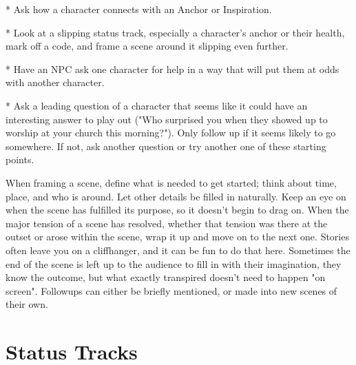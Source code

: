 \documentclass[
  oneside,
  statementpaper,
  9pt]{memoir}
\begin{document}
\begin{MC}
* Ask how a character connects with an Anchor or Inspiration.

* Look at a slipping status track, especially a character’s anchor or their health, mark off a code, and frame a scene around it slipping even further.

* Have an NPC ask one character for help in a way that will put them at odds with another character.

* Ask a leading question of a character that seems like it could have an interesting answer to play out ("Who surprised you when they showed up to worship at your church this morning?"). Only follow up if it seems likely to go somewhere. If not, ask another question or try another one of these starting points.

When framing a scene, define what is needed to get started; think about time, place, and who is around. Let other details be filled in naturally. Keep an eye on when the scene has fulfilled its purpose, so it doesn’t begin to drag on. When the major tension of a scene has resolved, whether that tension was there at the outset or arose within the scene, wrap it up and move on to the next one. Stories often leave you on a cliffhanger, and it can be fun to do that here. Sometimes the end of the scene is left up to the audience to fill in with their imagination, they know the outcome, but what exactly transpired doesn't need to happen "on screen". Followups can either be briefly mentioned, or made into new scenes of their own.

\end{MC}

\newpage

\label{Status Tracks chapter}

\hypertarget{status-tracks}{%
\chapter{Status Tracks}\label{status-tracks}}
\end{document}
